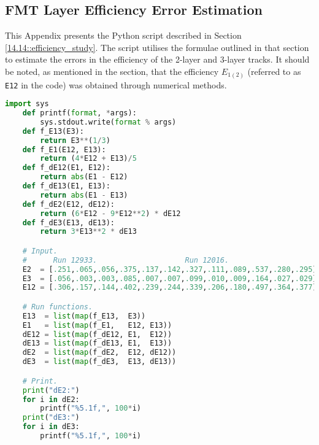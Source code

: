 \subsection{FMT Layer Efficiency Error Estimation}
\label{20.03::fmt_layer_efficiency_error_estimation}
    This Appendix presents the Python script described in Section \ref{14.14::efficiency_study}.
    The script utilises the formulae outlined in that section to estimate the errors in the efficiency of the 2-layer and 3-layer tracks.
    It should be noted, as mentioned in the section, that the efficiency $E_{1(2)}$ (referred to as \verb|E12| in the code) was obtained through numerical methods.

    \begin{lstlisting}[language=Python]
    import sys
    def printf(format, *args):
        sys.stdout.write(format % args)
    def f_E13(E3):
        return E3**(1/3)
    def f_E1(E12, E13):
        return (4*E12 + E13)/5
    def f_dE12(E1, E12):
        return abs(E1 - E12)
    def f_dE13(E1, E13):
        return abs(E1 - E13)
    def f_dE2(E12, dE12):
        return (6*E12 - 9*E12**2) * dE12
    def f_dE3(E13, dE13):
        return 3*E13**2 * dE13

    # Input.
    #      Run 12933.                    Run 12016.
    E2  = [.251,.065,.056,.375,.137,.142,.327,.111,.089,.537,.280,.295]
    E3  = [.056,.003,.003,.085,.007,.007,.099,.010,.009,.164,.027,.029]
    E12 = [.306,.157,.144,.402,.239,.244,.339,.206,.180,.497,.364,.377]

    # Run functions.
    E13  = list(map(f_E13,  E3))
    E1   = list(map(f_E1,   E12, E13))
    dE12 = list(map(f_dE12, E1,  E12))
    dE13 = list(map(f_dE13, E1,  E13))
    dE2  = list(map(f_dE2,  E12, dE12))
    dE3  = list(map(f_dE3,  E13, dE13))

    # Print.
    print("dE2:")
    for i in dE2:
        printf("%5.1f,", 100*i)
    print("dE3:")
    for i in dE3:
        printf("%5.1f,", 100*i)
    \end{lstlisting}
